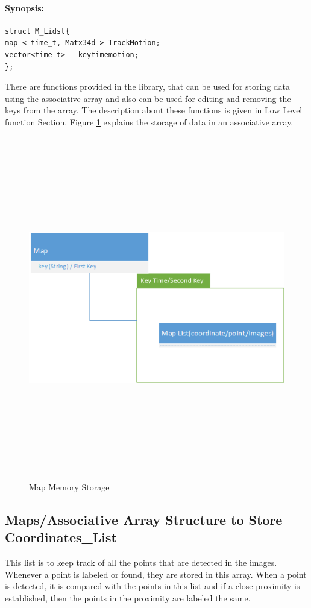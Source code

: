\paragraph{Synopsis:}
\begin{lstlisting}
struct M_Lidst{
map < time_t, Matx34d > TrackMotion; 
vector<time_t>   keytimemotion;  
}; 
\end{lstlisting}
There are functions provided in the library, that can be used for storing data using the associative array and also can be used for editing and removing the keys from the array. The description about these functions is given in Low Level function Section. Figure \ref{fig:map} explains the storage of data in an associative array.
\begin{figure}[ht]
    \centering
    \includegraphics[width=15cm,height=15cm,keepaspectratio]{Pictures/map.png}
    \caption{Map Memory Storage}
    \label{fig:map}
\end{figure}

\subsection{Maps/Associative Array Structure to Store Coordinates\_List}
This list is to keep track of all the points that are detected in the images. Whenever a point is labeled or found, they are stored in this array. When a point is detected, it is compared with the points in this list and if a close proximity is established, then the points in the proximity are labeled the same.
